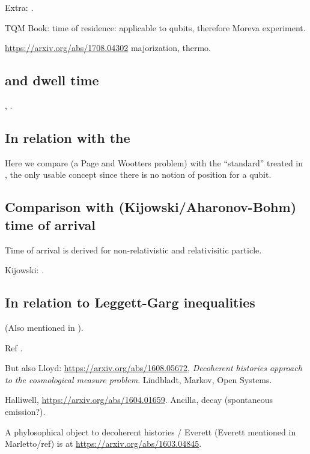 Extra: \cite{TimeAnyons}.

TQM Book: time of residence: applicable to qubits, therefore Moreva experiment.

\url{https://arxiv.org/abs/1708.04302} majorization, thermo.


\subsection{and dwell time}

\cite[\S 5]{TQM2}, \cite{YearsleyHalliwell_Clocks}.

\subsection{In relation with the }

Here we compare \cite{Moreva:synthetic, Moreva:illustration}
(a Page and Wootters problem)
with the ``standard'' 
treated in \cite[\S 5.5.2]{TQM2},
the only usable concept since there is no notion of position
for a qubit.

\subsection{Comparison with (Kijowski/Aharonov-Bohm) time of arrival}

Time of arrival is derived for non-relativistic \parencite{Delgado_TOA, Delgado_TOA2}
and relativisitic \parencite{Leon_TOA_R}
particle.

Kijowski: \cite{Kijowski_Time, Kijowski_Comment}.

\subsection{In relation to Leggett-Garg inequalities}
(Also mentioned in \cite{Moreva_position}).

Ref \cite{LeggettGarg+PageWootters}.

But also Lloyd: \url{https://arxiv.org/abs/1608.05672},
\emph{Decoherent histories approach to the cosmological measure problem}.
Lindbladt, Markov, Open Systems.

Halliwell, \url{https://arxiv.org/abs/1604.01659}. Ancilla, decay (spontaneous emission?).

A phylosophical object to decoherent histories / Everett (Everett mentioned in Marletto/ref)
is at
\url{https://arxiv.org/abs/1603.04845}.



